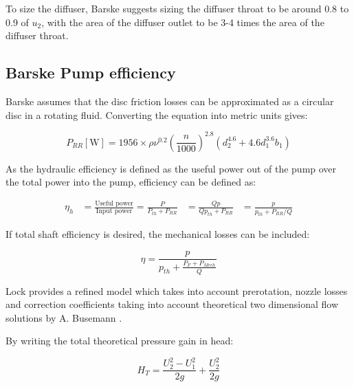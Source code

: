 
To size the diffuser, Barske suggests sizing the diffuser throat to be around 0.8 to 0.9 of $u_2$, with the area of the diffuser outlet to be 3-4 times the area of the diffuser throat.

\subsection{Barske Pump efficiency}

Barske assumes that the disc friction losses can be approximated as a circular disc in a rotating fluid. Converting the equation into metric units gives:

\begin{equation}
    P_{RR} [\mathrm{W}] = 1956\times\rho\nu^{0.2}\left(\frac{n}{1000}\right)^{2.8}\left(d_2^{4.6}+4.6d_1^{3.6}b_1\right)
\end{equation}

As the hydraulic efficiency is defined as the useful power out of the pump over the total power into the pump, efficiency can be defined as:

\begin{align}
\eta_h & = \frac{\text{Useful power}}{\text{Input power}} = \frac{P}{P_{th}+P_{RR}}
 & = \frac{Qp}{Qp_{th}+P_{RR}}
 & = \frac{p}{p_{th}+P_{RR}/Q}
\end{align}

If total shaft efficiency is desired, the mechanical losses can be included:

\begin{equation}
    \eta=\frac{p}{p_{th}+\frac{P_F+P_{Mech}}{Q}}
\end{equation}

Lock provides a refined model which takes into account prerotation, nozzle losses and correction coefficients taking into account theoretical two dimensional flow solutions by A. Busemann \cite{buseman}. 


By writing the total theoretical pressure gain in head:

\begin{equation}
    H_T = \frac{U_2^2 - U_1^2}{2g} + \frac{U_2^2}{2g}
\end{equation}

